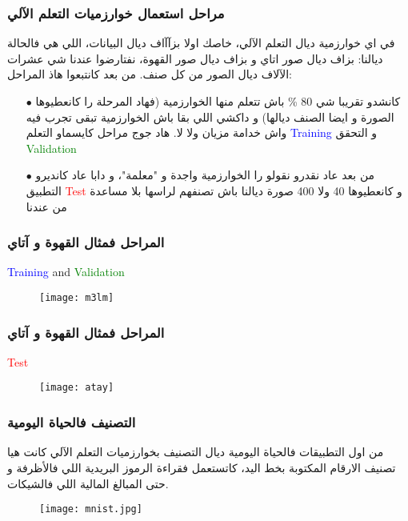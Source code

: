 \documentclass[16pt]{beamer}
\begin{document}
\begin{frame}
\frametitle{\textarabic{ مراحل استعمال خوارزميات التعلم الآلي }}
\begin{minipage}{0.95\textwidth}
\begin{Arabic}
في اي خوارزمية ديال التعلم الآلي، خاصك اولا بزآآاف ديال البيانات، اللي هي فالحالة ديالنا: بزاف ديال صور اتاي و بزاف ديال صور القهوة، نفتارضوا عندنا شي عشرات الآلاف ديال الصور من كل صنف. من بعد كانتبعوا هاذ المراحل:

\begin{itemize}
\item[$\bullet$] كانشدو تقريبا شي 80 \% باش تتعلم منها الخوارزمية (فهاد المرحلة را كانعطيوها الصورة و ايضا الصنف ديالها) و داكشي اللي بقا باش الخوارزمية تبقى تجرب فيه واش خدامة مزيان ولا لا. هاد جوج مراحل كايسماو التعلم \textcolor{blue}{Training} و التحقق \textcolor{green}{Validation}

\item[$\bullet$] من بعد عاد نقدرو نقولو را الخوارزمية واجدة و "معلمة"، و دابا عاد كانديرو التطبيق \textcolor{red}{Test} و كانعطيوها 40 ولا 400 صورة ديالنا باش تصنفهم لراسها بلا مساعدة من عندنا

\end{itemize} 
\end{Arabic}
\end{minipage}
\end{frame}


\begin{frame}
\frametitle{\textarabic{المراحل فمثال القهوة و آتاي}}
\begin{minipage}{0.95\textwidth}
 \textcolor{blue}{Training} and \textcolor{green}{Validation}
\begin{figure}
\texttt{[image: m3lm]}
\end{figure}
\end{minipage}
\end{frame}


\begin{frame}
\frametitle{\textarabic{المراحل فمثال القهوة و آتاي}}
\textcolor{red}{Test}
\begin{figure}
\texttt{[image: atay]}
\end{figure}
\end{frame}



\begin{frame}
\frametitle{\textarabic{ التصنيف فالحياة اليومية}}
\begin{minipage}{0.95\textwidth} 
\begin{Arabic}
 من اول التطبيقات فالحياة اليومية ديال التصنيف بخوارزميات التعلم الآلي كانت هيا تصنيف الارقام المكتوبة بخط اليد، كاتستعمل فقراءة الرموز البريدية اللي فالأظرفة و حتى المبالغ المالية اللي فالشيكات.
 \end{Arabic}
\begin{figure}
\texttt{[image: mnist.jpg]}
\end{figure}
\end{minipage}
\end{frame}
\end{document}
